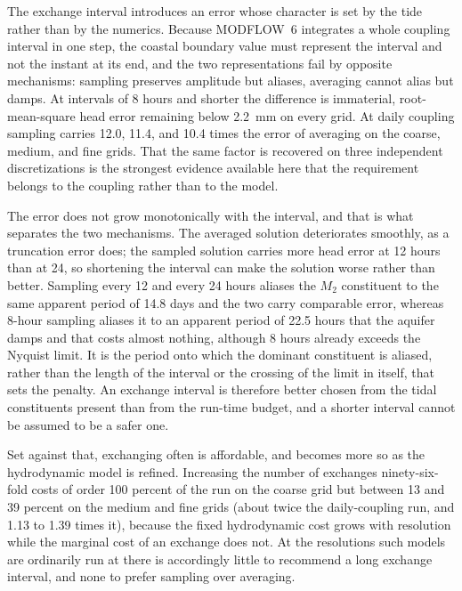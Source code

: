 \documentclass[preprint,authoryear,11pt]{elsarticle}
\begin{document}
The exchange interval introduces an error whose character is set by the tide rather than by the numerics. Because MODFLOW~6 integrates a whole coupling interval in one step, the coastal boundary value must represent the interval and not the instant at its end, and the two representations fail by opposite mechanisms: sampling preserves amplitude but aliases, averaging cannot alias but damps. At intervals of 8 hours and shorter the difference is immaterial, root-mean-square head error remaining below \SI{2.2}{\milli\meter} on every grid. At daily coupling sampling carries 12.0, 11.4, and 10.4 times the error of averaging on the coarse, medium, and fine grids. That the same factor is recovered on three independent discretizations is the strongest evidence available here that the requirement belongs to the coupling rather than to the model.

The error does not grow monotonically with the interval, and that is what separates the two mechanisms. The averaged solution deteriorates smoothly, as a truncation error does; the sampled solution carries more head error at 12 hours than at 24, so shortening the interval can make the solution worse rather than better. Sampling every 12 and every 24 hours aliases the $M_2$ constituent to the same apparent period of 14.8 days and the two carry comparable error, whereas 8-hour sampling aliases it to an apparent period of 22.5 hours that the aquifer damps and that costs almost nothing, although 8 hours already exceeds the Nyquist limit. It is the period onto which the dominant constituent is aliased, rather than the length of the interval or the crossing of the limit in itself, that sets the penalty. An exchange interval is therefore better chosen from the tidal constituents present than from the run-time budget, and a shorter interval cannot be assumed to be a safer one.

Set against that, exchanging often is affordable, and becomes more so as the hydrodynamic model is refined. Increasing the number of exchanges ninety-six-fold costs of order 100 percent of the run on the coarse grid but between 13 and 39 percent on the medium and fine grids (about twice the daily-coupling run, and 1.13 to 1.39 times it), because the fixed hydrodynamic cost grows with resolution while the marginal cost of an exchange does not. At the resolutions such models are ordinarily run at there is accordingly little to recommend a long exchange interval, and none to prefer sampling over averaging.
\end{document}

